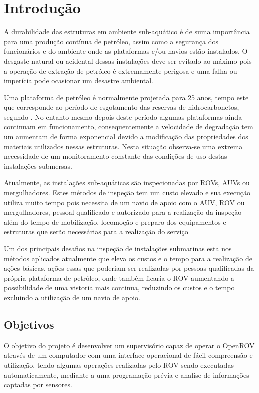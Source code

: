 \chapter{Introdução}

A durabilidade das estruturas em ambiente sub-aquático é de suma importância para uma produção contínua de petróleo, assim como a segurança dos funcionários e do ambiente onde as plataformas e/ou navios estão instalados. O desgaste natural ou acidental dessas instalações deve ser evitado ao máximo pois a operação de extração de petróleo é extremamente perigosa e uma falha ou imperícia pode ocasionar um desastre ambiental.

Uma plataforma de petróleo é normalmente projetada para 25 anos, tempo este que corresponde ao período de esgotamento das reservas de hidrocarbonetos, segundo \cite{1}. No entanto mesmo depois deste período algumas plataformas ainda continuam em funcionamento, consequentemente a velocidade de degradação tem um aumentam de forma exponencial devido a modificação das propriedades dos materiais utilizados nessas estruturas. Nesta situação observa-se uma extrema necessidade de um monitoramento constante das condições de uso destas instalações submersas.    
 
Atualmente, as instalações sub-aquáticas são inspecionadas por ROVs, AUVs ou mergulhadores. Estes métodos de inspeção tem um custo elevado
e sua execução utiliza muito tempo pois necessita de um navio de apoio com o AUV, ROV ou mergulhadores, pessoal qualificado e autorizado para a realização da inspeção além do tempo de mobilização, locomoção e preparo dos equipamentos e estruturas que serão necessárias para a realização do serviço
 

Um dos principais desafios na inspeção de instalações submarinas esta nos métodos aplicados atualmente que eleva os custos e o tempo para a realização de ações básicas, ações essas que poderiam ser realizadas por pessoas qualificadas da própria plataforma de petróleo, onde também ficaria o ROV aumentando a possibilidade de uma vistoria mais continua, reduzindo os custos e o tempo excluindo a utilização de um navio de apoio.
 


\section{Objetivos}
O objetivo do projeto é desenvolver um supervisório capaz de operar o OpenROV através de um computador com uma interface operacional de fácil compreensão e utilização, tendo algumas operações realizadas pelo ROV sendo executadas automaticamente, mediante a uma programação prévia e analise de informações captadas por sensores. 

